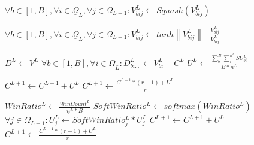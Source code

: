 {\begin{algorithm}[h]
\begin{algorithmic}[1]
          \State $\forall b \in [1,B], \forall i \in \underline{\Omega}_L, \forall j \in \Omega_{L+1}: V^L_{bij} \gets Squash(V^L_{bij})$
          
        \Else
          \State $\forall b \in [1,B], \forall i \in \underline{\Omega}_L, \forall j \in \Omega_{L+1}: V_{bij}^L \gets tanh{\left\lVert V^L_{bij}\right\rVert } \frac{V_{bij}^L}{\left\lVert V_{bij}^L\right\rVert }$
        \EndIf
      \EndIf

      \EndIf
  \end{algorithmic}
\end{algorithm}

\begin{algorithm}[h]
  \begin{algorithmic}[1]
          \State $D^L \gets V^L$ 
        \Else
          \State $\forall b \in [1,B], \forall i \in \underline{\Omega}_L: D^L_{bi::} \gets V^L_{bi} - C^L$
        \EndIf
        \State {}
        \State {} 
        \State {}
        \State $U^L \gets \frac{\sum_b^B \sum_i^{\underline{n}^L} SU^L_{bi}}{B \ast \underline{n}^L}$ 


            \State $C^{L+1} \gets C^{L+1} + U^L$
            \State $C^{L+1} \gets \frac{C^{L+1} \ast (r-1) + U^L}{r}$ 
          \EndIf

          \Else
            \State $WinRatio^L \gets \frac{WinCount^L}{\underline{n}^L \ast B}$
            \State $SoftWinRatio^L \gets softmax(WinRatio^L)$
            \State $\forall j \in \Omega_{L+1}: U^L_j \gets SoftWinRatio_j^L \ast U^L_j$
              \State $C^{L+1} \gets C^{L+1} + U^L$
              \State $C^{L+1} \gets \frac{C^{L+1} \ast (r-1) + U^L}{r}$
            \EndIf
        \EndIf


\end{algorithmic}
\end{algorithm}}
